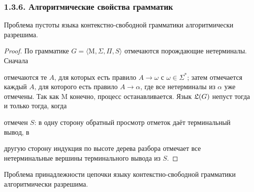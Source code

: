 \documentclass[mathserif,12pt,aspectratio=169]{beamer}
\begin{document}
\begin{frame}[t]
	\frametitle{1.3.6. Алгоритмические свойства грамматик }
	\setlength{\parskip}{1pt}
	\sloppy
	
	\begin{theorem}
		Проблема пустоты языка контекстно-свободной грамматики алгоритмически разрешима.
	\end{theorem}
	
	\begin{proof}
		\par\vspace{-4pt}
		По грамматике $G=\langle \mathrm{M},\Sigma,\Pi,S\rangle$ отмечаются порождающие нетерминалы. Сначала
		
		отмечаются те $A$, для которых есть правило $A\to\omega$ с $\omega\in\Sigma^*$; затем отмечается каждый $A$, для которого есть правило $A\to\alpha$, где все нетерминалы из $\alpha$ уже отмечены. Так как $\mathrm{M}$ конечно, процесс останавливается. Язык $\frak{L}(G)$ непуст тогда и только тогда, когда 
		
		отмечен $S$: в одну сторону обратный просмотр отметок даёт терминальный вывод, в 
		
		другую сторону индукция по высоте дерева разбора отмечает все нетерминальные вершины терминального вывода из $S$.
	\end{proof}
	
	\begin{theorem}
		Проблема принадлежности цепочки языку контекстно-свободной грамматики алгоритмически разрешима.
	\end{theorem}
	
\end{frame}
\end{document}
